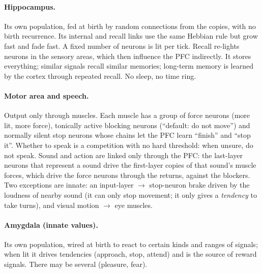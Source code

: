 \documentclass[11pt]{article}
\begin{document}
\paragraph{Hippocampus.} Its own population, fed at birth by random connections from the copies, with no birth recurrence.
Its internal and recall links use the same Hebbian rule but grow fast and fade fast. A fixed number of neurons is lit per
tick. Recall re-lights neurons in the sensory areas, which then influence the PFC indirectly. It stores everything;
similar signals recall similar memories; long-term memory is learned by the cortex through repeated recall. No sleep, no
time ring.

\paragraph{Motor area and speech.} Output only through muscles. Each muscle has a group of force neurons (more lit, more
force), tonically active blocking neurons (``default: do not move'') and normally silent stop neurons whose chains let the
PFC learn ``finish'' and ``stop it''. Whether to speak is a competition with no hard threshold: when unsure, do not
speak. Sound and action are linked only through the PFC: the last-layer neurons that represent a sound drive the
first-layer copies of that sound's muscle forces, which drive the force neurons through the returns, against the
blockers. Two exceptions are innate: an input-layer $\to$ stop-neuron brake driven by the loudness of nearby sound (it can
only stop movement; it only gives a \emph{tendency} to take turns), and visual motion $\to$ eye muscles.

\paragraph{Amygdala (innate values).} Its own population, wired at birth to react to certain kinds and ranges of signals;
when lit it drives tendencies (approach, stop, attend) and is the source of reward signals. There may be several (pleasure,
fear).
\end{document}
